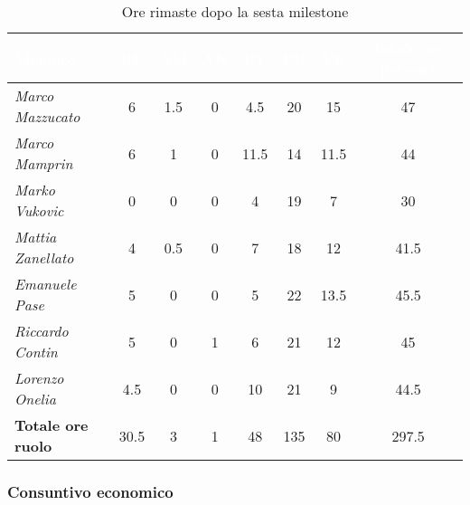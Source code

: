 \begin{table}[H]
    \renewcommand\arraystretch{1.5}
    \centering
    \begin{tabular}{|l|c|c|c|c|c|c|c|}
    \hline
    \rowcolor[HTML]{036400}
    \textcolor{white}{\textbf{Membro}} & \multicolumn{1}{c|}{\textcolor{white}{\textbf{RE}}} & \multicolumn{1}{c|}{\textcolor{white}{\textbf{AM}}} & \multicolumn{1}{c|}{\textcolor{white}{\textbf{AN}}} & \multicolumn{1}{c|}{\textcolor{white}{\textbf{PT}}} & \multicolumn{1}{c|}{\textcolor{white}{\textbf{PR}}} & \multicolumn{1}{c|}{\textcolor{white}{\textbf{VE}}} & \multicolumn{1}{c|}{\textcolor{white}{\textbf{Totale ore persona}}} \\ \hline
    \rowcolor[HTML]{EFEFEF}\textit{Marco Mazzucato}  & 6    & 1.5  & 0     & 4.5   & 20  & 15     & 47     \\ \hline
    \rowcolor[HTML]{C0C0C0}\textit{Marco Mamprin}    & 6    & 1    & 0     & 11.5  & 14  & 11.5   & 44     \\ \hline
    \rowcolor[HTML]{EFEFEF}\textit{Marko Vukovic}    & 0    & 0    & 0     & 4     & 19  & 7      & 30     \\ \hline
    \rowcolor[HTML]{C0C0C0}\textit{Mattia Zanellato} & 4    & 0.5  & 0     & 7     & 18  & 12     & 41.5     \\ \hline
    \rowcolor[HTML]{EFEFEF}\textit{Emanuele Pase}    & 5    & 0    & 0     & 5     & 22  & 13.5   & 45.5     \\ \hline
    \rowcolor[HTML]{C0C0C0}\textit{Riccardo Contin}  & 5    & 0    & 1     & 6     & 21  & 12     & 45     \\ \hline
    \rowcolor[HTML]{EFEFEF}\textit{Lorenzo Onelia}   & 4.5  & 0    & 0     & 10    & 21  & 9      & 44.5     \\ \hline
    \rowcolor[HTML]{C0C0C0}\textbf{Totale ore ruolo} & 30.5 & 3    & 1     & 48    & 135 & 80     & 297.5    \\ \hline
    \end{tabular}
    \caption{Ore rimaste dopo la sesta milestone}
\end{table}

\subsubsection{Consuntivo economico}

